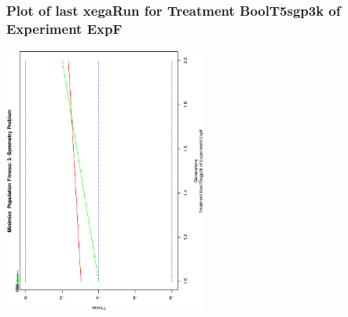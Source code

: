  \begin{frame}
 \frametitle{ Plot of last xegaRun for Treatment BoolT5sgp3k of Experiment ExpF }
 \begin{center}
\includegraphics[width=0.5\textwidth, angle=-90]
{ExpFPlotPopStatsFigure004.eps}
 \end{center}
 \label{report/ExpFPlotPopStatsFigure004.eps}  
 \end{frame}

